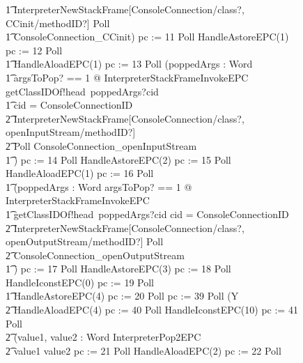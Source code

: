 \begin{figure}[tp!]
{\begin{circus}
    \t1 \lschexpract InterpreterNewStackFrame[ConsoleConnection/class?, CCinit/methodID?] \rschexpract \circseq Poll \circseq \\
    \t1 ConsoleConnection\_CCinit) \circseq pc := 11 \circseq Poll \circseq HandleAstoreEPC(1) \circseq pc := 12 \circseq Poll \circseq \\
    \t1 HandleAloadEPC(1) \circseq pc := 13 \circseq Poll \circseq (\circvar poppedArgs : Word \circspot \\
    \t1 \lschexpract \exists argsToPop? == 1 @ InterpreterStackFrameInvokeEPC \rschexpract \circseq getClassIDOf!head~poppedArgs?cid \then {} \\
    \t1 \circif cid = ConsoleConnectionID \circthen {} \\
    \t2 \lschexpract InterpreterNewStackFrame[ConsoleConnection/class?, openInputStream/methodID?] \rschexpract \circseq \\
    \t2 Poll \circseq ConsoleConnection\_openInputStream \\
    \t1 \circfi) \circseq pc := 14 \circseq Poll \circseq HandleAstoreEPC(2) \circseq pc := 15 \circseq Poll \circseq HandleAloadEPC(1) \circseq pc := 16 \circseq Poll \circseq \\
    \t1 (\circvar poppedArgs : Word \circspot \lschexpract \exists argsToPop? == 1 @ InterpreterStackFrameInvokeEPC \rschexpract \circseq \\
    \t1 getClassIDOf!head~poppedArgs?cid \then \circif cid = ConsoleConnectionID \circthen {} \\
    \t2 \lschexpract InterpreterNewStackFrame[ConsoleConnection/class?, openOutputStream/methodID?] \rschexpract \circseq Poll \circseq \\
    \t2 ConsoleConnection\_openOutputStream \\
    \t1 \circfi) \circseq pc := 17 \circseq Poll \circseq HandleAstoreEPC(3) \circseq pc := 18 \circseq Poll \circseq HandleIconstEPC(0) \circseq pc := 19 \circseq Poll \circseq \\
    \t1 HandleAstoreEPC(4) \circseq pc := 20 \circseq Poll \circseq pc := 39 \circseq Poll \circseq (\circmu Y \circspot \\
    \t2 HandleAloadEPC(4) \circseq pc := 40 \circseq Poll \circseq HandleIconstEPC(10) \circseq  pc := 41 \circseq Poll \circseq \\
    \t2 (\circvar value1, value2 : Word \circspot InterpreterPop2EPC \\
    \t2 \circif value1 \leq value2 \circthen pc := 21 \circseq Poll \circseq HandleAloadEPC(2) \circseq pc := 22 \circseq Poll \circseq \\

\end{circus}}
\end{figure}
